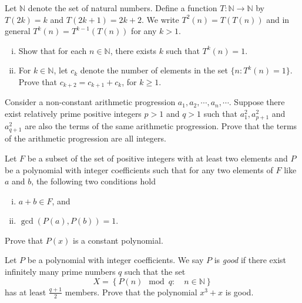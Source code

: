 \documentclass[problems.tex]{subfile}
\begin{document}
	\begin{problem}
		Let $\mathbb{N}$ denote the set of natural numbers. Define a function $T:\mathbb{N}\rightarrow\mathbb{N}$ by $T(2k)=k$ and $T(2k+1)=2k+2$. We write $T^2(n)=T(T(n))$ and in general $T^k(n)=T^{k-1}(T(n))$ for any $k>1$.
		\begin{enumerate}[(i)]
			\item Show that for each $n\in\mathbb{N}$, there exists $k$ such that $T^k(n)=1$.
			\item For $k\in\mathbb{N}$, let $c_k$ denote the number of elements in the set $\{n: T^k(n)=1\}$. Prove that $c_{k+2}=c_{k+1}+c_k$, for $k\ge 1$.
		\end{enumerate}
	\end{problem}

	\begin{problem}
		Consider a non-constant arithmetic progression $a_1, a_2,\cdots, a_n,\cdots$. Suppose there exist relatively prime positive integers $p>1$ and $q>1$ such that $a_1^2, a_{p+1}^2$ and $a_{q+1}^2$ are also the terms of the same arithmetic progression. Prove that the terms of the arithmetic progression are all integers. %
	\end{problem}

	\begin{problem}
		Let $F$ be a subset of the set of positive integers with at least two elements and $P$ be a polynomial with integer coefficients such that for any two elements of $F$ like $a$ and $b$, the following two conditions hold
		\begin{enumerate}[(i)]
			\item $a+b \in F$, and
			\item $\gcd(P(a),P(b))=1$.
		\end{enumerate}
		Prove that $P(x)$ is a constant polynomial. %
	\end{problem}

	\begin{problem}
		Let $P$ be a polynomial with integer coefficients. We say $P$ is \textit{good} if there exist infinitely many prime numbers $q$ such that the set $$X=\left\{P(n) \mod q : \quad n\in \mathbb N\right\}$$
		has at least $\frac{q+1}{2}$ members. Prove that the polynomial $x^3+x$ is good. %
	\end{problem}
\end{document}
